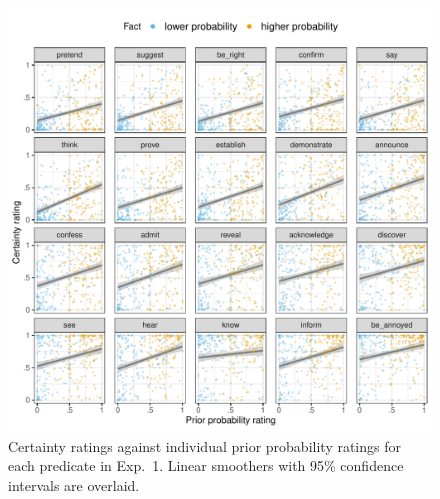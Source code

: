 \documentclass[OpenMind]{stjour}
\begin{document}
\begin{figure}[h!]

\includegraphics[width=\textwidth]{../../results/9-prior-projection/graphs/projection-by-prior}

\caption{Certainty ratings against individual prior probability ratings for each predicate in Exp.~1. Linear smoothers with 95\% confidence intervals are overlaid.}
\label{f-projection}
\end{figure}
\end{document}
